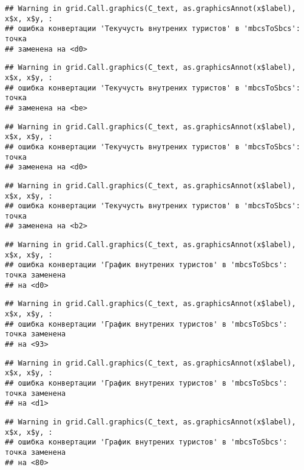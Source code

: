 \documentclass[
]{article}
\begin{document}
\begin{verbatim}
## Warning in grid.Call.graphics(C_text, as.graphicsAnnot(x$label), x$x, x$y, :
## ошибка конвертации 'Текучусть внутрених туристов' в 'mbcsToSbcs': точка
## заменена на <d0>
\end{verbatim}

\begin{verbatim}
## Warning in grid.Call.graphics(C_text, as.graphicsAnnot(x$label), x$x, x$y, :
## ошибка конвертации 'Текучусть внутрених туристов' в 'mbcsToSbcs': точка
## заменена на <be>
\end{verbatim}

\begin{verbatim}
## Warning in grid.Call.graphics(C_text, as.graphicsAnnot(x$label), x$x, x$y, :
## ошибка конвертации 'Текучусть внутрених туристов' в 'mbcsToSbcs': точка
## заменена на <d0>
\end{verbatim}

\begin{verbatim}
## Warning in grid.Call.graphics(C_text, as.graphicsAnnot(x$label), x$x, x$y, :
## ошибка конвертации 'Текучусть внутрених туристов' в 'mbcsToSbcs': точка
## заменена на <b2>
\end{verbatim}

\begin{verbatim}
## Warning in grid.Call.graphics(C_text, as.graphicsAnnot(x$label), x$x, x$y, :
## ошибка конвертации 'График внутрених туристов' в 'mbcsToSbcs': точка заменена
## на <d0>
\end{verbatim}

\begin{verbatim}
## Warning in grid.Call.graphics(C_text, as.graphicsAnnot(x$label), x$x, x$y, :
## ошибка конвертации 'График внутрених туристов' в 'mbcsToSbcs': точка заменена
## на <93>
\end{verbatim}

\begin{verbatim}
## Warning in grid.Call.graphics(C_text, as.graphicsAnnot(x$label), x$x, x$y, :
## ошибка конвертации 'График внутрених туристов' в 'mbcsToSbcs': точка заменена
## на <d1>
\end{verbatim}

\begin{verbatim}
## Warning in grid.Call.graphics(C_text, as.graphicsAnnot(x$label), x$x, x$y, :
## ошибка конвертации 'График внутрених туристов' в 'mbcsToSbcs': точка заменена
## на <80>
\end{verbatim}
\end{document}
